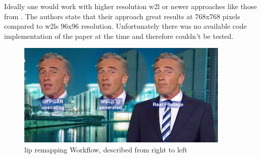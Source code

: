 \documentclass[
  a4paper,  %
  twoside,  %
  bibliography=totoc,
  headsepline,
  cleardoublepage=empty,
  parskip=half,
  draft=false
]{scrbook}
\begin{document}
Ideally one would work with higher resolution \gls{w2l} or newer approaches like those from \citet{guptaGeneratingUltraHighResolution2023}. The authors state that their approach great results at 768x768 pixels compared to \gls{w2l}s 96x96 resolution. Unfortunately there was no available code implementation of the paper at the time and therefore couldn't be tested.

\begin{figure}[h]
  \centering
  \includegraphics[width=0.9\textwidth]{./graphics/images/wav2lip/wav2lip-demo.png}
  \caption{lip remapping Workflow, described from right to left}
  \label{fig:wav2lip-demo}
\end{figure}
\end{document}

